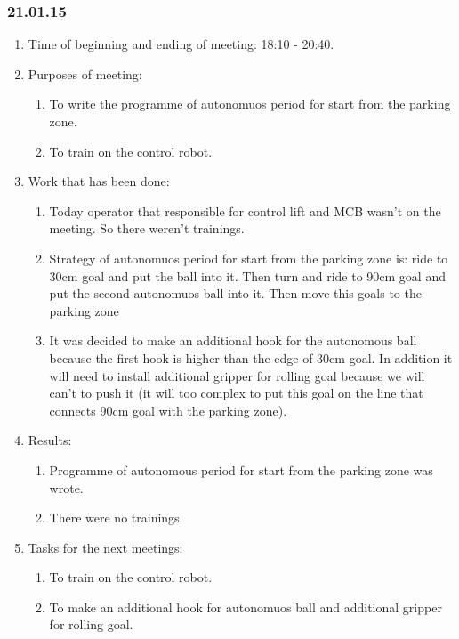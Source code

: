 \subsubsection{21.01.15}
\begin{enumerate}
	
	\item Time of beginning and ending of meeting: 18:10 - 20:40.
	
	\item Purposes of meeting: 
	\begin{enumerate}
		
		\item To write the programme of autonomuos period for start from the parking zone.
		
		\item To train on the control robot.
		
	\end{enumerate}

	\item Work that has been done:
	\begin{enumerate}
		
		\item Today operator that responsible for control lift and MCB wasn't on the meeting. So there weren't trainings.
		
		\item Strategy of autonomuos period for start from the parking zone is: ride to 30cm goal and put the ball into it. Then turn and ride to 90cm goal and put the second autonomuos ball into it. Then move this goals to the parking zone
		
        \item It was decided to make an additional hook for the autonomous ball because the first hook is higher than the edge of 30cm goal. In addition it will need to install additional gripper for rolling goal because we will can't to push it (it will too complex to put this goal on the line that connects 90cm goal with the parking zone).
		
	\end{enumerate}
	
	\item Results:
	\begin{enumerate}
		
		\item Programme of autonomous period for start from the parking zone was wrote.
		
		\item There were no trainings.
		
	\end{enumerate}
	
	\item Tasks for the next meetings:
	\begin{enumerate}
		
		\item To train on the control robot.
		
		\item To make an additional hook for autonomuos ball and additional gripper for rolling goal.
			
	\end{enumerate}
\end{enumerate}
\fillpage
